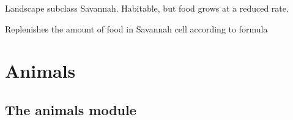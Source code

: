 \documentclass[a4paper,10pt,openany,oneside]{sphinxmanual}
\begin{document}

\begin{fulllineitems}
\label{landscape:biosim.landscape.Savannah}
Landscape subclass Savannah.
Habitable, but food grows at a reduced rate.

\begin{fulllineitems}
\label{landscape:biosim.landscape.Savannah.grow_food}
Replenishes the amount of food in Savannah cell according to formula

\end{fulllineitems}


\end{fulllineitems}



\chapter{Animals}
\label{animals:animals}\label{animals::doc}

\section{The animals module}
\label{animals:the-animals-module}\label{animals:module-biosim.animals}
\end{document}
